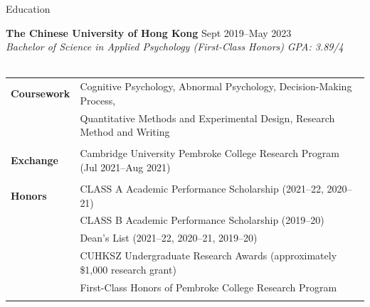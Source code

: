 \documentclass{resume} %
\begin{document}
\begin{rSection}{Education}
\vspace{1em}

{\bf The Chinese University of Hong Kong} \hfill {Sept 2019--May 2023} \\
{\textit{Bachelor of Science in Applied Psychology (First-Class Honors)}} \hfill {\textit{GPA: 3.89/4}} \\
\vspace{-0.1em} \\ 
\begin{tabular}{ @{} >{\bfseries}l @{\hspace{6ex}} l }
Coursework 
& Cognitive Psychology, Abnormal Psychology, Decision-Making Process, \\
& Quantitative Methods and Experimental Design, Research Method and Writing \\
\vspace{-0.2em} \\
Exchange & Cambridge University Pembroke College Research Program (Jul 2021--Aug 2021) \\
\vspace{-0.2em} \\ 
Honors & CLASS A Academic Performance Scholarship (2021--22, 2020--21) \\ 
       & CLASS B Academic Performance Scholarship (2019--20) \\ 
       & Dean's List (2021--22, 2020--21, 2019--20) \\ 
       & CUHKSZ Undergraduate Research Awards (approximately \$1,000 research grant) \\ 
       & First-Class Honors of Pembroke College Research Program \\ 
\vspace{-0.6em} \\ 
\end{tabular}
\end{rSection}
\end{document}

